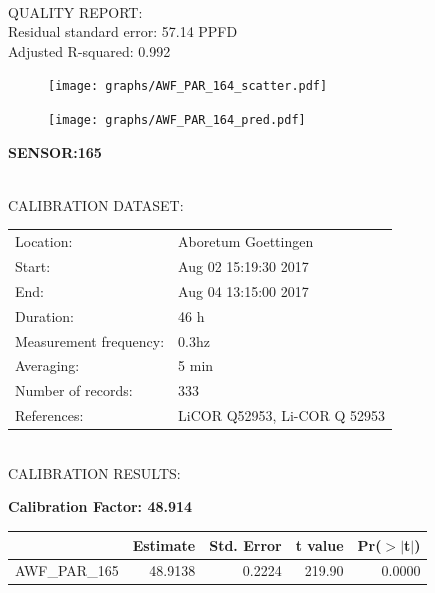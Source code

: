 \documentclass[oneside]{report}
\begin{document}
\hrulefill\\
QUALITY REPORT:\\
Residual standard error: 57.14 PPFD\\
Adjusted R-squared: 0.992



\begin{figure}[H]
  \centering
  \texttt{[image: graphs/AWF\_PAR\_164\_scatter.pdf]}
\end{figure}




\begin{figure}[H]
  \centering
  \texttt{[image: graphs/AWF\_PAR\_164\_pred.pdf]}
\end{figure}

\pagebreak


\begin{center}
\large{\textbf{SENSOR:165}}\\
\end{center}

\hrulefill\\
CALIBRATION DATASET:\\
\begin{table}[h!]
  \centering
  \label{tab:table1}
  \begin{tabular}{ll}
    Location: & Aboretum Goettingen\\ 
    
    
    Start:  & Aug 02 15:19:30 2017 \\
    End:   & Aug 04 13:15:00 2017\\ 
    Duration: & 46 h\\
    Measurement frequency: & 0.3hz\\
    Averaging:  &5 min\\
    Number of records: & 333 \\
    References: & LiCOR Q52953, Li-COR Q 52953 \\
  \end{tabular}
\end{table}

\hrulefill\\
CALIBRATION RESULTS:\\


\begin{center}
\textbf{\large{Calibration Factor: 48.914}}\\
\end{center}
\begin{table}[ht]
\centering
\begin{tabular}{rrrrr}
  \hline
 & Estimate & Std. Error & t value & Pr($>$$|$t$|$) \\ 
  \hline
AWF\_PAR\_165 & 48.9138 & 0.2224 & 219.90 & 0.0000 \\ 
   \hline
\end{tabular}
\end{table}
\end{document}
